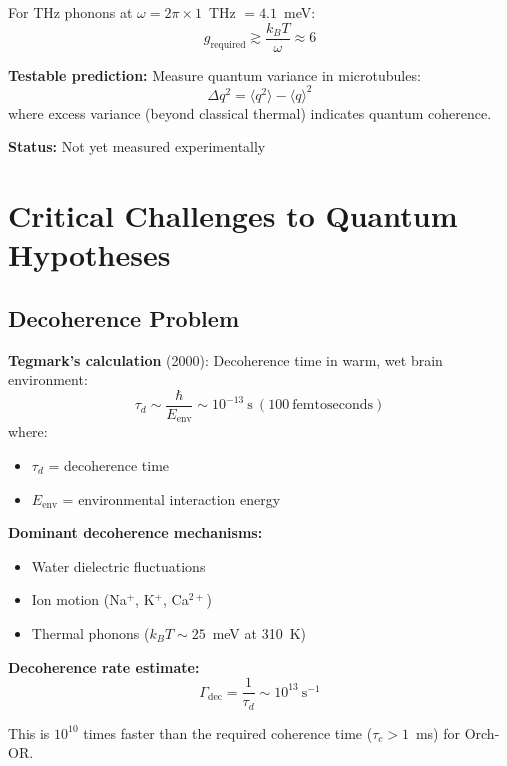 For THz phonons at $\omega = 2\pi \times 1$~THz $= 4.1$~meV:
\begin{equation}
g_{\mathrm{required}} \gtrsim \frac{k_B T}{\omega} \approx 6
\end{equation}

\textbf{Testable prediction:} Measure quantum variance in microtubules:
\begin{equation}
\Delta q^2 = \langle q^2 \rangle - \langle q \rangle^2
\end{equation}
where excess variance (beyond classical thermal) indicates quantum coherence.

\textbf{Status:} Not yet measured experimentally

\section{Critical Challenges to Quantum Hypotheses}

\subsection{Decoherence Problem}

\textbf{Tegmark's calculation} (2000): Decoherence time in warm, wet brain environment:
\begin{equation}
\tau_d \sim \frac{\hbar}{E_{\mathrm{env}}} \sim 10^{-13}\ \mathrm{s}\ (100\ \mathrm{femtoseconds})
\end{equation}
where:
\begin{itemize}
\item $\tau_d$ = decoherence time
\item $E_{\mathrm{env}}$ = environmental interaction energy
\end{itemize}

\textbf{Dominant decoherence mechanisms:}
\begin{itemize}
\item Water dielectric fluctuations
\item Ion motion (Na$^+$, K$^+$, Ca$^{2+}$)
\item Thermal phonons ($k_B T \sim 25$~meV at 310~K)
\end{itemize}

\textbf{Decoherence rate estimate:}
\begin{equation}
\Gamma_{\mathrm{dec}} = \frac{1}{\tau_d} \sim 10^{13}\ \mathrm{s}^{-1}
\end{equation}

This is $10^{10}$ times faster than the required coherence time ($\tau_c > 1$~ms) for Orch-OR.

